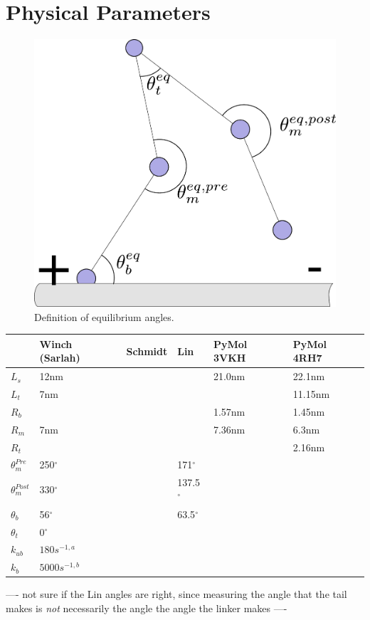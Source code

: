 \documentclass[10pt]{article} %
\begin{document}
\section{Physical Parameters}

\begin{figure}
  \centering
  \includegraphics[width=.45\textwidth]{../figures/equilibrium-onebound}
  \caption{Definition of equilibrium angles.}
  \label{fig:eq_angles}
\end{figure}

\begin{center}
  \begin{tabular}{| l | l | l | l | l | l |}
    \hline
    & Winch (Sarlah) & Schmidt & Lin & PyMol 3VKH & PyMol 4RH7\\\hline
    $L_s$ & 12nm & & & 21.0nm & 22.1nm\\ \hline
    $L_t$ &  7nm & & & & 11.15nm\\ \hline
    $R_b$ &  & & & 1.57nm & 1.45nm\\ \hline
    $R_m$ &  7nm & & & 7.36nm & 6.3nm\\ \hline
    $R_t$ &  & & & & 2.16nm \\ \hline
    $\theta_{m}^{Pre}$ & 250$^{\circ}$ & & 171$^{\circ}$ & &\\ \hline
    $\theta_{m}^{Post}$ & 330$^{\circ}$ & & 137.5$^{\circ}$ & &\\ \hline
    $\theta_{b}$ & 56$^{\circ}$ & & 63.5$^{\circ}$ & &\\ \hline
    $\theta_{t}$ & 0$^{\circ}$ & & & &\\ \hline
    $k_{ub}$ & $180 s^{-1,a}$ & & & &\\ \hline
    $k_b$ & $5000 s^{-1,b}$ & & & &\\ \hline
  \end{tabular}
\end{center}

---- not sure if the Lin angles are right, since measuring the angle that the tail makes is \textit{not} necessarily the angle the angle the linker makes ----\\
\end{document}
